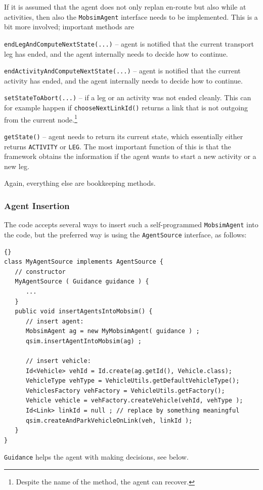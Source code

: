If it is assumed that the agent does not only replan en-route but also while at activities, then also the \lstinline$MobsimAgent$ interface needs to be implemented.  This is a bit more involved; important methods are
\begin{compactitem}
\item \lstinline$endLegAndComputeNextState(...)$ -- agent is notified that the current transport leg has ended, and the agent internally needs to decide how to continue.
\item \lstinline$endActivityAndComputeNextState(...)$ -- agent is notified that the current activity has ended, and the agent internally needs to decide how to continue.
\item \lstinline$setStateToAbort(...)$ -- if a leg or an activity was not ended cleanly.  This can for example happen if \lstinline$chooseNextLinkId()$ returns a link that is not outgoing from the current node.\footnote{%
%
Despite the name of the method, the agent can recover.  %
}
\item \lstinline$getState()$ -- agent needs to return its current state, which essentially either returns \lstinline$ACTIVITY$ or \lstinline$LEG$.  The most important function of this is that the framework obtains the information if the agent wants to start a new activity or a new leg.
\end{compactitem}
Again, everything else are bookkeeping methods.

\subsubsection{Agent Insertion}
The code accepts several ways to insert such a self-programmed \lstinline$MobsimAgent$ into the code, but the preferred way is using the \lstinline$AgentSource$ interface, as follows:
\begin{lstlisting}[basicstyle=\footnotesize\tt]{}
class MyAgentSource implements AgentSource {
   // constructor
   MyAgentSource ( Guidance guidance ) {
      ...
   }
   public void insertAgentsIntoMobsim() {
      // insert agent:
      MobsimAgent ag = new MyMobsimAgent( guidance ) ;
      qsim.insertAgentIntoMobsim(ag) ;
        
      // insert vehicle:
      Id<Vehicle> vehId = Id.create(ag.getId(), Vehicle.class);
      VehicleType vehType = VehicleUtils.getDefaultVehicleType();
      VehiclesFactory vehFactory = VehicleUtils.getFactory();
      Vehicle vehicle = vehFactory.createVehicle(vehId, vehType );
      Id<Link> linkId = null ; // replace by something meaningful
      qsim.createAndParkVehicleOnLink(veh, linkId );
   }
}
\end{lstlisting}
\lstinline$Guidance$ helps the agent with making decisions, see below.

